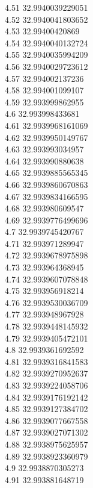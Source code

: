 {4.51	32.9940039229051\\
4.52	32.9940041803652\\
4.53	32.99400420869\\
4.54	32.9940040132724\\
4.55	32.9940035994209\\
4.56	32.9940029723612\\
4.57	32.994002137236\\
4.58	32.994001099107\\
4.59	32.993999862955\\
4.6	32.993998433681\\
4.61	32.9939968161069\\
4.62	32.9939950149767\\
4.63	32.993993034957\\
4.64	32.993990880638\\
4.65	32.9939885565345\\
4.66	32.9939860670863\\
4.67	32.9939834166595\\
4.68	32.993980609547\\
4.69	32.9939776499696\\
4.7	32.9939745420767\\
4.71	32.993971289947\\
4.72	32.9939678975898\\
4.73	32.993964368945\\
4.74	32.9939607078848\\
4.75	32.993956918214\\
4.76	32.9939530036709\\
4.77	32.993948967928\\
4.78	32.9939448145932\\
4.79	32.9939405472101\\
4.8	32.9939361692592\\
4.81	32.9939316841583\\
4.82	32.9939270952637\\
4.83	32.9939224058706\\
4.84	32.9939176192142\\
4.85	32.9939127384702\\
4.86	32.9939077667558\\
4.87	32.9939027071302\\
4.88	32.9938975625957\\
4.89	32.9938923360979\\
4.9	32.9938870305273\\
4.91	32.993881648719\\
}
